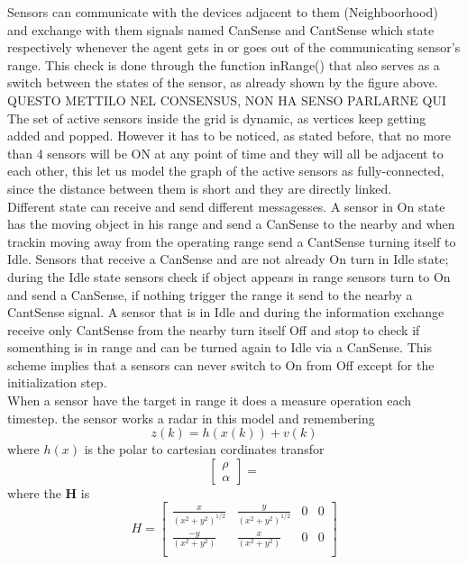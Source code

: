 \documentclass{article}
\begin{document}
\begin{multicols}{2}
    Sensors can communicate with the devices adjacent to them (Neighboorhood) and exchange with them signals named CanSense and CantSense
    which state respectively whenever the agent gets in or goes out of the communicating sensor's range. This check is done through the 
    function inRange() that also serves as a switch between the states of the sensor, as already shown by the figure above.
    \\
    QUESTO METTILO NEL CONSENSUS, NON HA SENSO PARLARNE QUI
    \\
    The set of active sensors inside the grid is dynamic, as vertices keep getting added and popped. However it has to be noticed, as stated before, that no 
    more than 4 sensors will be ON at any point of time and they will all be adjacent to each other, this let us model the graph of the active 
    sensors as fully-connected, since the distance between them is short and they are directly linked.
    \\
    Different state can receive and send different messagesses. A sensor in On state has the moving
    object in his range and send a CanSense to the nearby and when trackin moving away from the operating range send a CantSense turning itself to Idle.
    Sensors that receive a CanSense and are not already On turn in Idle state; during the Idle state sensors check
    if object appears in range sensors turn to On and send a CanSense, if nothing trigger the range it send to the nearby a CantSense signal.
    A sensor that is in Idle and during the information exchange receive only CantSense from the nearby turn itself Off and stop to check if somenthing is in range and
    can be turned again to Idle via a CanSense. This scheme implies that a sensors can never switch to On from Off except for the initialization step.
    \\
    When a sensor have the target in range it does a measure operation each timestep. the sensor works a radar in this model and remembering
    \begin{equation}
        z(k)=h(x(k))+v(k)
    \end{equation}
    where $h(x)$ is the polar to cartesian cordinates transfor
    \begin{equation*}
        \begin{bmatrix}
            \rho\\ \alpha
        \end{bmatrix}=
    \end{equation*}
    where the \textbf{H} is
    \begin{equation}
        H= \begin{bmatrix}
            \frac{x}{(x^{2}+y^{2})^{1/2}} & \frac{y}{(x^{2}+y^{2})^{1/2}}& 0& 0 \\
            \frac{-y}{(x^{2}+y^{2})}  & \frac{x}{(x^{2}+y^{2})}& 0& 0 \\
        \end{bmatrix}
    \end{equation}

\end{multicols}
\end{document}
